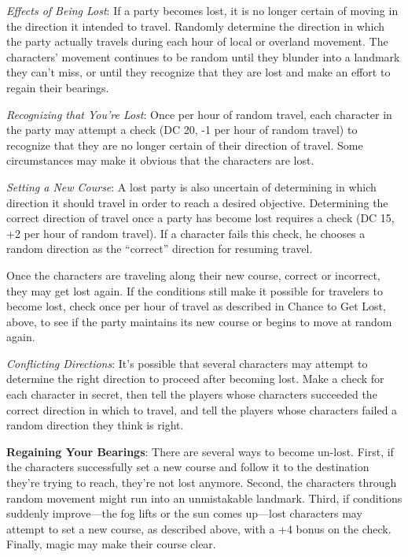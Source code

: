 \textit{Effects of Being Lost}: If a party becomes lost, it is no longer certain of moving in the direction it intended to travel. Randomly determine the direction in which the party actually travels during each hour of local or overland movement. The characters' movement continues to be random until they blunder into a landmark they can't miss, or until they recognize that they are lost and make an effort to regain their bearings.

\textit{Recognizing that You're Lost}: Once per hour of random travel, each character in the party may attempt a  check (DC 20, -1 per hour of random travel) to recognize that they are no longer certain of their direction of travel. Some circumstances may make it obvious that the characters are lost.

\textit{Setting a New Course}: A lost party is also uncertain of determining in which direction it should travel in order to reach a desired objective. Determining the correct direction of travel once a party has become lost requires a  check (DC 15, +2 per hour of random travel). If a character fails this check, he chooses a random direction as the “correct” direction for resuming travel.

Once the characters are traveling along their new course, correct or incorrect, they may get lost again. If the conditions still make it possible for travelers to become lost, check once per hour of travel as described in Chance to Get Lost, above, to see if the party maintains its new course or begins to move at random again.

\textit{Conflicting Directions}: It's possible that several characters may attempt to determine the right direction to proceed after becoming lost. Make a  check for each character in secret, then tell the players whose characters succeeded the correct direction in which to travel, and tell the players whose characters failed a random direction they think is right.

\textbf{Regaining Your Bearings}: There are several ways to become un-lost. First, if the characters successfully set a new course and follow it to the destination they're trying to reach, they're not lost anymore. Second, the characters through random movement might run into an unmistakable landmark. Third, if conditions suddenly improve---the fog lifts or the sun comes up---lost characters may attempt to set a new course, as described above, with a +4 bonus on the  check. Finally, magic may make their course clear.

